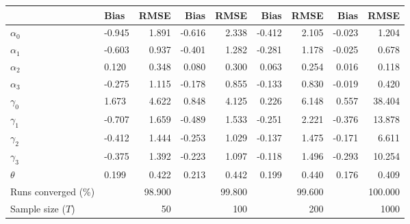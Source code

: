 
\begin{tabular}[t]{llrrrrrrr}
\toprule
  & Bias & RMSE & Bias & RMSE & Bias & RMSE & Bias & RMSE\\
\midrule
$\alpha_{0}$ & -0.945 & 1.891 & -0.616 & 2.338 & -0.412 & 2.105 & -0.023 & 1.204\\
$\alpha_{1}$ & -0.603 & 0.937 & -0.401 & 1.282 & -0.281 & 1.178 & -0.025 & 0.678\\
$\alpha_{2}$ & 0.120 & 0.348 & 0.080 & 0.300 & 0.063 & 0.254 & 0.016 & 0.118\\
$\alpha_{3}$ & -0.275 & 1.115 & -0.178 & 0.855 & -0.133 & 0.830 & -0.019 & 0.420\\
$\gamma_{0}$ & 1.673 & 4.622 & 0.848 & 4.125 & 0.226 & 6.148 & 0.557 & 38.404\\
$\gamma_{1}$ & -0.707 & 1.659 & -0.489 & 1.533 & -0.251 & 2.221 & -0.376 & 13.878\\
$\gamma_{2}$ & -0.412 & 1.444 & -0.253 & 1.029 & -0.137 & 1.475 & -0.171 & 6.611\\
$\gamma_{3}$ & -0.375 & 1.392 & -0.223 & 1.097 & -0.118 & 1.496 & -0.293 & 10.254\\
$\theta$ & 0.199 & 0.422 & 0.213 & 0.442 & 0.199 & 0.440 & 0.176 & 0.409\\
Runs converged (\%) &  & 98.900 &  & 99.800 &  & 99.600 &  & 100.000\\
Sample size ($T$) &  & 50 &  & 100 &  & 200 &  & 1000\\
\bottomrule
\end{tabular}

